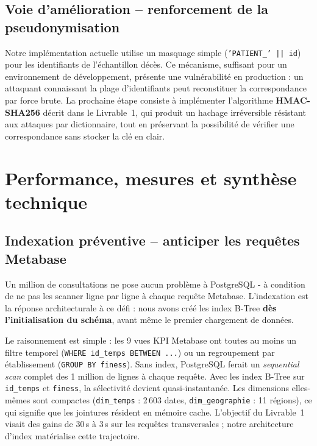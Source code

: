 \documentclass[12pt,a4paper]{report}
\begin{document}
\subsection{Voie d'amélioration -- renforcement de la pseudonymisation}
Notre implémentation actuelle utilise un masquage simple (\texttt{'PATIENT\_' || id}) pour les identifiants de l'échantillon décès. Ce mécanisme, suffisant pour un environnement de développement, présente une vulnérabilité en production : un attaquant connaissant la plage d'identifiants peut reconstituer la correspondance par force brute. La prochaine étape consiste à implémenter l'algorithme \textbf{HMAC-SHA256} décrit dans le Livrable~1, qui produit un hachage irréversible résistant aux attaques par dictionnaire, tout en préservant la possibilité de vérifier une correspondance sans stocker la clé en clair.

\clearpage
\section{Performance, mesures et synthèse technique}

\subsection{Indexation préventive -- anticiper les requêtes Metabase}
Un million de consultations ne pose aucun problème à PostgreSQL - à condition de ne pas les scanner ligne par ligne à chaque requête Metabase. L'indexation est la réponse architecturale à ce défi : nous avons créé les index B-Tree \textbf{dès l'initialisation du schéma}, avant même le premier chargement de données.

Le raisonnement est simple : les 9 vues KPI Metabase ont toutes au moins un filtre temporel (\texttt{WHERE id\_temps BETWEEN ...}) ou un regroupement par établissement (\texttt{GROUP BY finess}). Sans index, PostgreSQL ferait un \textit{sequential scan} complet des 1 million de lignes à chaque requête. Avec les index B-Tree sur \texttt{id\_temps} et \texttt{finess}, la sélectivité devient quasi-instantanée. Les dimensions elles-mêmes sont compactes (\texttt{dim\_temps} : 2\,603 dates, \texttt{dim\_geographie} : 11 régions), ce qui signifie que les jointures résident en mémoire cache. L'objectif du Livrable~1 visait des gains de 30\,s à 3\,s sur les requêtes transversales ; notre architecture d'index matérialise cette trajectoire.
\end{document}
